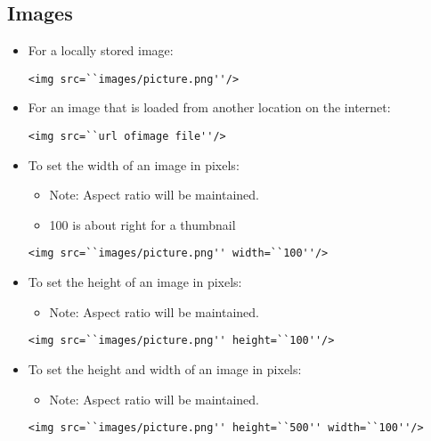 \documentclass{article}
\begin{document}
\subsection{Images}
\begin{itemize}
  \item For a locally stored image:

\begin{lstlisting}
<img src=``images/picture.png''/>
\end{lstlisting}

  \item For an image that is loaded from another location on the internet:

\begin{lstlisting}
<img src=``url ofimage file''/>
\end{lstlisting}

  \item To set the width of an image in pixels:
    \begin{itemize}
      \item Note: Aspect ratio will be maintained.
      \item 100 is about right for a thumbnail
    \end{itemize}

\begin{lstlisting}
<img src=``images/picture.png'' width=``100''/>
\end{lstlisting}

  \item To set the height of an image in pixels:
    \begin{itemize}
      \item Note: Aspect ratio will be maintained.
    \end{itemize}

\begin{lstlisting}
<img src=``images/picture.png'' height=``100''/>
\end{lstlisting}

  \item To set the height and width of an image in pixels:
    \begin{itemize}
      \item Note: Aspect ratio will \color{red}{not} be maintained.
    \end{itemize}

\begin{lstlisting}
<img src=``images/picture.png'' height=``500'' width=``100''/>
\end{lstlisting}

\end{itemize}
\end{document}
